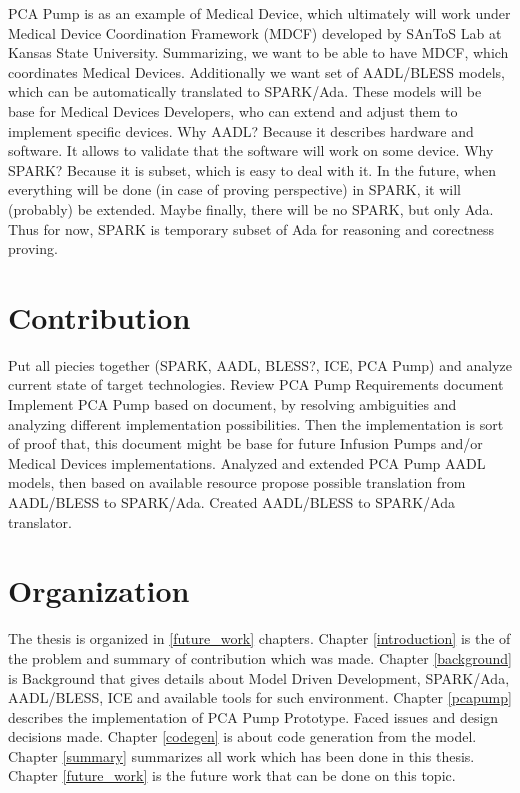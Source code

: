 PCA Pump is as an example of Medical Device, which ultimately will work under Medical Device Coordination Framework (MDCF) developed by SAnToS Lab at Kansas State University.
Summarizing, we want to be able to have MDCF, which coordinates Medical Devices. Additionally we want set of AADL/BLESS models, which can be automatically translated to SPARK/Ada. These models will be base for Medical Devices Developers, who can extend and adjust them to implement specific devices. 
Why AADL? Because it describes hardware and software. It allows to validate that the software will work on some device.
Why SPARK? Because it is subset, which is easy to deal with it. In the future, when everything will be done (in case of proving perspective) in SPARK, it will (probably) be extended. Maybe finally, there will be no SPARK, but only Ada. Thus for now, SPARK is temporary subset of Ada for reasoning and corectness proving.

\section{Contribution}
\label{introduction:contribution}
Put all piecies together (SPARK, AADL, BLESS?, ICE, PCA Pump) and analyze current state of target technologies.
Review PCA Pump Requirements document
Implement PCA Pump based on document, by resolving ambiguities and analyzing different implementation possibilities. Then the implementation is sort of proof that, this document might be base for future Infusion Pumps and/or Medical Devices implementations.
Analyzed and extended PCA Pump AADL models, then based on available resource propose possible translation from AADL/BLESS to SPARK/Ada.
Created AADL/BLESS to SPARK/Ada translator.

\section{Organization}
\label{introduction:organization}
The thesis is organized in \ref{future_work} chapters. 
Chapter \ref{introduction} is the of the problem and summary of contribution which was made. 
Chapter \ref{background} is Background that gives details about Model Driven Development, SPARK/Ada, AADL/BLESS, ICE and available tools for such environment. 
Chapter \ref{pcapump} describes the implementation of PCA Pump Prototype. Faced issues and design decisions made.
Chapter \ref{codegen} is about code generation from the model. 
Chapter \ref{summary} summarizes all work which has been done in this thesis. 
Chapter \ref{future_work} is the future work that can be done on this topic.
